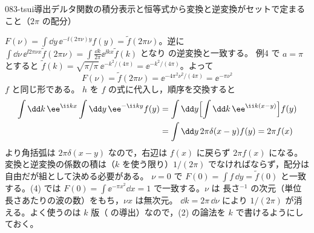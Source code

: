 \documentclass[uplatex,dvipdfmx,a4paper,11pt]{jsarticle}
\begin{document}
\begin{mondai}{083-tsui}{導出}{デルタ関数の積分表示と恒等式から変換と逆変換がセットで定まること（$2\pi$ の配分）}
\begin{tadashii}
 $F(\nu)=\int\dd y\,\ee^{-\ii(2\pi\nu)y}f(y)=\tilde f(2\pi\nu)$。逆に $\int\dd\nu\,\ee^{\ii2\pi\nu x}\tilde f(2\pi\nu)=\int\frac{\dd k}{2\pi}\ee^{\ii kx}\tilde f(k)$ となり  の逆変換と一致する。
 例4 で $a=\pi$ とすると $\tilde f(k)=\sqrt{\pi/\pi}\,\ee^{-k^{2}/(4\pi)}=\ee^{-k^{2}/(4\pi)}$。よって
\[ F(\nu)=\tilde f(2\pi\nu)=\ee^{-4\pi^{2}\nu^{2}/(4\pi)}=\ee^{-\pi\nu^{2}} \]
$f$ と同じ形である。
 $h$ を $f$ の式に代入し，順序を交換すると
\begin{align*}
  \int\dd k\,\ee^{\ii kx}\int\dd y\,\ee^{-\ii ky}f(y)&=\int\dd y\Bigl[\int\dd k\,\ee^{\ii k(x-y)}\Bigr]f(y)\\
  &=\int\dd y\,2\pi\delta(x-y)f(y)=2\pi f(x)
\end{align*}
 より角括弧は $2\pi\delta(x-y)$ なので，右辺は $f(x)$ に戻らず $2\pi f(x)$ になる。変換と逆変換の係数の積は（$k$ を使う限り）$1/(2\pi)$ でなければならず，配分は自由だが組として決める必要がある。
\kenzan $\nu=0$ で $F(0)=\int f\,\dd y=\tilde f(0)$ と一致する。(4) では $F(0)=\int\ee^{-\pi x^{2}}\dd x=1$ で一致する。$\nu$ は 長さ$^{-1}$ の次元（単位長さあたりの波の数）をもち，$\nu x$ は無次元。
\tsumazuki $\dd k=2\pi\,\dd\nu$ により $1/(2\pi)$ が消える。よく使うのは $k$ 版（ の導出）なので，(2) の論法を $k$ で書けるようにしておく。
\end{tadashii}
\end{mondai}
\end{document}
